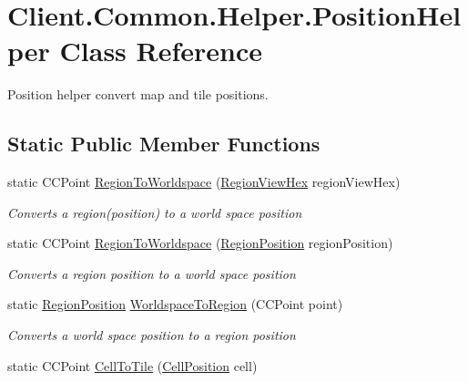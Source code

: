 \hypertarget{classClient_1_1Common_1_1Helper_1_1PositionHelper}{}\section{Client.\+Common.\+Helper.\+Position\+Helper Class Reference}
\label{classClient_1_1Common_1_1Helper_1_1PositionHelper}


Position helper convert map and tile positions.  


\subsection*{Static Public Member Functions}
\begin{DoxyCompactItemize}
\item 
static C\+C\+Point \hyperlink{classClient_1_1Common_1_1Helper_1_1PositionHelper_a73e8150dc8ae933541741469f9aa4100}{Region\+To\+Worldspace} (\hyperlink{classClient_1_1Common_1_1Views_1_1RegionViewHex}{Region\+View\+Hex} region\+View\+Hex)
\begin{DoxyCompactList}\small\item\em Converts a region(position) to a world space position \end{DoxyCompactList}\item 
static C\+C\+Point \hyperlink{classClient_1_1Common_1_1Helper_1_1PositionHelper_a2e018b1aff62981009186b8d6f03ff6b}{Region\+To\+Worldspace} (\hyperlink{classCore_1_1Models_1_1RegionPosition}{Region\+Position} region\+Position)
\begin{DoxyCompactList}\small\item\em Converts a region position to a world space position \end{DoxyCompactList}\item 
static \hyperlink{classCore_1_1Models_1_1RegionPosition}{Region\+Position} \hyperlink{classClient_1_1Common_1_1Helper_1_1PositionHelper_aa533e44b8451700c1864554a6559ce41}{Worldspace\+To\+Region} (C\+C\+Point point)
\begin{DoxyCompactList}\small\item\em Converts a world space position to a region position \end{DoxyCompactList}\item 
static C\+C\+Point \hyperlink{classClient_1_1Common_1_1Helper_1_1PositionHelper_a44e228caa4d6ea5a002c7b3715c67d19}{Cell\+To\+Tile} (\hyperlink{classCore_1_1Models_1_1CellPosition}{Cell\+Position} cell)

\end{DoxyCompactItemize}
